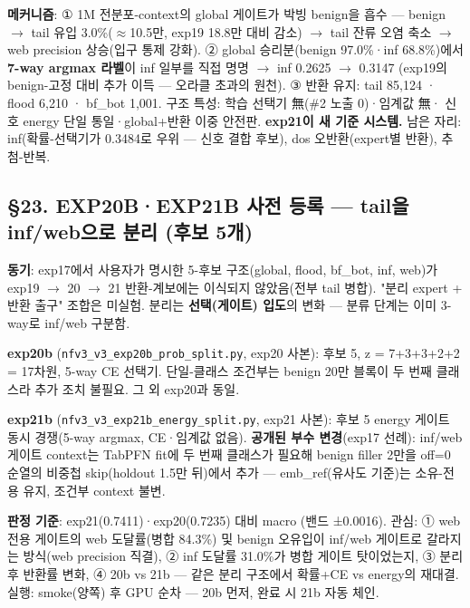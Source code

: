 \textbf{메커니즘}: ① 1M 전분포-context의 global 게이트가 박빙 benign을 흡수 — benign \ensuremath{\rightarrow} tail 유입 3.0\%(\ensuremath{\approx}10.5만, exp19 18.8만 대비 감소)  \ensuremath{\rightarrow}  tail 잔류 오염 축소  \ensuremath{\rightarrow}  web precision 상승(입구 통제 강화). ② global 승리분(benign 97.0\%·inf 68.8\%)에서 \textbf{7-way argmax 라벨}이 inf 일부를 직접 명명  \ensuremath{\rightarrow}  inf 0.2625 \ensuremath{\rightarrow} 0.3147 (exp19의 benign-고정 대비 추가 이득 — 오라클 초과의 원천). ③ 반환 유지: tail 85,124 · flood 6,210 · bf\_\allowbreak{}bot 1,001. 구조 특성: 학습 선택기 無(\#2 노출 0)·임계값 無· 신호 energy 단일 통일·global+\allowbreak{}반환 이중 안전판. \textbf{exp21이 새 기준 시스템.} 남은 자리: inf(확률-선택기가 0.3484로 우위 — 신호 결합 후보), dos 오반환(expert별 반환), 추첨-반복.

\subsection{§23. EXP20B·EXP21B 사전 등록 — tail을 inf/\allowbreak{}web으로 분리 (후보 5개)}
\textbf{동기}: exp17에서 사용자가 명시한 5-후보 구조(global, flood, bf\_\allowbreak{}bot, inf, web)가 exp19 \ensuremath{\rightarrow} 20 \ensuremath{\rightarrow} 21 반환-계보에는 이식되지 않았음(전부 tail 병합). "분리 expert +\allowbreak{} 반환 출구" 조합은 미실험. 분리는 \textbf{선택(게이트) 입도}의 변화 — 분류 단계는 이미 3-way로 inf/\allowbreak{}web 구분함.

\textbf{exp20b} (\texttt{nfv3\_\allowbreak{}\allowbreak{}v3\_\allowbreak{}\allowbreak{}exp20b\_\allowbreak{}\allowbreak{}p\allowbreak{}rob\_\allowbreak{}\allowbreak{}spli\allowbreak{}t.\allowbreak{}py}, exp20 사본): 후보 5, z =\allowbreak{} 7+\allowbreak{}3+\allowbreak{}3+\allowbreak{}2+\allowbreak{}2 =\allowbreak{} 17차원, 5-way CE 선택기. 단일-클래스 조건부는 benign 20만 블록이 두 번째 클래스라 추가 조치 불필요. 그 외 exp20과 동일.

\textbf{exp21b} (\texttt{nfv3\_\allowbreak{}\allowbreak{}v3\_\allowbreak{}\allowbreak{}exp21b\_\allowbreak{}\allowbreak{}e\allowbreak{}nergy\_\allowbreak{}\allowbreak{}sp\allowbreak{}lit.\allowbreak{}py}, exp21 사본): 후보 5 energy 게이트 동시 경쟁(5-way argmax, CE·임계값 없음). \textbf{공개된 부수 변경}(exp17 선례): inf/\allowbreak{}web 게이트 context는 TabPFN fit에 두 번째 클래스가 필요해 benign filler 2만을 off=\allowbreak{}0 순열의 비중첩 skip(holdout 1.5만 뒤)에서 추가 — emb\_\allowbreak{}ref(유사도 기준)는 소유-전용 유지, 조건부 context 불변.

\textbf{판정 기준}: exp21(0.7411)·exp20(0.7235) 대비 macro (밴드 ±0.0016). 관심: ① web 전용 게이트의 web 도달률(병합 84.3\%) 및 benign 오유입이 inf/\allowbreak{}web 게이트로 갈라지는 방식(web precision 직결), ② inf 도달률 31.0\%가 병합 게이트 탓이었는지, ③ 분리 후 반환률 변화, ④ 20b vs 21b — 같은 분리 구조에서 확률+\allowbreak{}CE vs energy의 재대결. 실행: smoke(양쪽) 후 GPU 순차 — 20b 먼저, 완료 시 21b 자동 체인.

